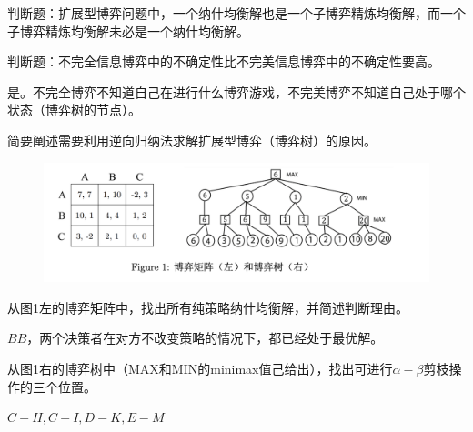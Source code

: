 \begin{problem}
	判断题：扩展型博弈问题中，一个纳什均衡解也是一个子博弈精炼均衡解，而一个子博弈精炼均衡解未必是一个纳什均衡解。
\end{problem}
\begin{solution}

\end{solution}


\begin{problem}
	判断题：不完全信息博弈中的不确定性比不完美信息博弈中的不确定性要高。
\end{problem}
\begin{solution}
	是。不完全博弈不知道自己在进行什么博弈游戏，不完美博弈不知道自己处于哪个状态（博弈树的节点）。
\end{solution}


\begin{problem}
	简要阐述需要利用逆向归纳法求解扩展型博弈（博弈树）的原因。
\end{problem}
\begin{solution}

\end{solution}

\begin{figure}[htbp]
	\centering
	\includegraphics[width=1\textwidth]{./figure/fig1.png}
  \end{figure}

\begin{problem}
	从图1左的博弈矩阵中，找出所有纯策略纳什均衡解，并简述判断理由。
\end{problem}
\begin{solution}
	$BB$，两个决策者在对方不改变策略的情况下，都已经处于最优解。
\end{solution}


\begin{problem}
	从图1右的博弈树中（MAX和MIN的minimax值己给出），找出可进行$\alpha-\beta$剪枝操作的三个位置。
\end{problem}
\begin{solution}
	$C-H,C-I,D-K,E-M$
\end{solution}


